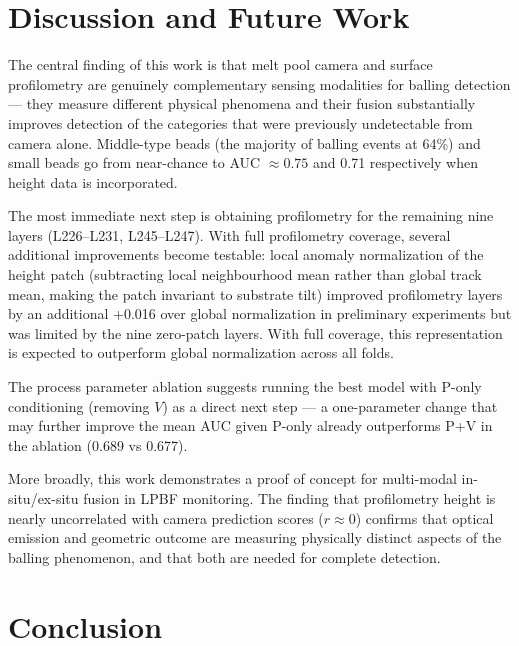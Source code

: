 \documentclass[12pt, letterpaper]{article}
\begin{document}
\section{Discussion and Future Work}

The central finding of this work is that melt pool camera
and surface profilometry are genuinely complementary sensing
modalities for balling detection — they measure different
physical phenomena and their fusion substantially improves
detection of the categories that were previously undetectable
from camera alone. Middle-type beads (the majority of balling
events at 64\%) and small beads go from near-chance to
AUC $\approx 0.75$ and 0.71 respectively when height data
is incorporated.

The most immediate next step is obtaining profilometry for
the remaining nine layers (L226--L231, L245--L247). With full
profilometry coverage, several additional improvements become
testable: local anomaly normalization of the height patch
(subtracting local neighbourhood mean rather than global
track mean, making the patch invariant to substrate tilt)
improved profilometry layers by an additional +0.016 over
global normalization in preliminary experiments but was
limited by the nine zero-patch layers. With full coverage,
this representation is expected to outperform global
normalization across all folds.

The process parameter ablation suggests running the best
model with P-only conditioning (removing $V$) as a direct
next step — a one-parameter change that may further improve
the mean AUC given P-only already outperforms P+V in the
ablation (0.689 vs 0.677).

More broadly, this work demonstrates a proof of concept for
multi-modal in-situ/ex-situ fusion in LPBF monitoring. The
finding that profilometry height is nearly uncorrelated with
camera prediction scores ($r \approx 0$) confirms that
optical emission and geometric outcome are measuring
physically distinct aspects of the balling phenomenon,
and that both are needed for complete detection.

\section{Conclusion}
\end{document}
